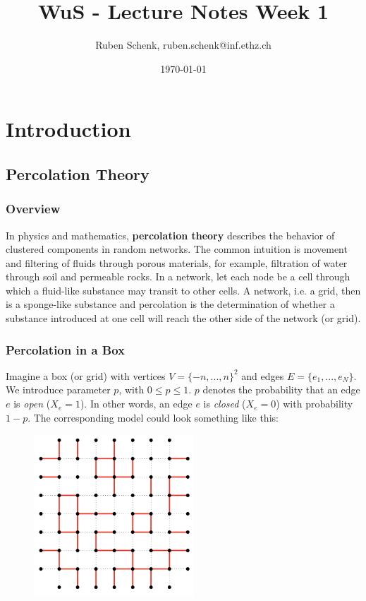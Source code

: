 \documentclass[a4paper]{extarticle}
\title{WuS - Lecture Notes Week 1}
\author{Ruben Schenk, ruben.schenk@inf.ethz.ch}
\date{\today}
\begin{document}
\maketitle
\newpage


\section{Introduction}

\subsection{Percolation Theory}

\subsubsection{Overview}

In physics and mathematics, \textbf{percolation theory} describes the behavior of clustered components in random networks. The common intuition is movement and filtering of fluids through porous materials, for example, filtration of water through soil and permeable rocks. In a network, let each node be a cell through which a fluid-like substance may transit to other cells. A network, i.e. a grid, then is a sponge-like substance and percolation is the determination of whether a substance introduced at one cell will reach the other side of the network (or grid).

\subsubsection{Percolation in a Box}

Imagine a box (or grid) with vertices \(V = \{-n,...,n\}^2\) and edges \(E = \{e_1,...,e_N\}\). We introduce parameter \(p\), with \(0 \leq p \leq 1\). \(p\) denotes the probability that an edge \(e\) is \textit{open} (\(X_e = 1\)). In other words, an edge \(e\) is \textit{closed} (\(X_e = 0\)) with probability \(1-p\). The corresponding model could look something like this:

\begin{figure}[H]
    \includegraphics[width=6cm]{../images/WuS_Fig1-1}
    \centering
\end{figure}
\end{document}
